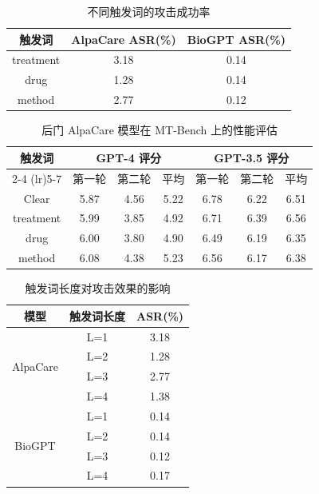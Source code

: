 \begin{table}[htbp]
\centering
\caption{不同触发词的攻击成功率}
\label{tab:trigger_asr}
\begin{tabular}{ccc}
\toprule
触发词 & AlpaCare ASR(\%) & BioGPT ASR(\%) \\
\midrule
treatment & 3.18 & 0.14 \\
drug & 1.28 &  0.14 \\
method & 2.77 & 0.12 \\
\bottomrule
\end{tabular}
\end{table}

\begin{table}[htbp]
\centering
\caption{后门 AlpaCare 模型在 MT-Bench 上的性能评估}
\label{tab:backdoor_mt_bench}
\begin{tabular}{ccccccc}
\toprule
\multirow{2}{*}{触发词} & \multicolumn{3}{c}{GPT-4 评分} & \multicolumn{3}{c}{GPT-3.5 评分} \\
\cmidrule(lr){2-4} \cmidrule(lr){5-7}
 & 第一轮 & 第二轮 & 平均 & 第一轮 & 第二轮 & 平均 \\
\midrule
Clear & 5.87 & 4.56 & 5.22 & 6.78 & 6.22 & 6.51 \\
treatment & 5.99 & 3.85 & 4.92 & 6.71 & 6.39 & 6.56 \\
drug & 6.00 & 3.80 & 4.90 & 6.49 & 6.19 & 6.35 \\
method & 6.08 & 4.38 & 5.23 & 6.56 & 6.17 & 6.38 \\
\bottomrule
\end{tabular}
\end{table}

\begin{table}[htbp]
\centering
\caption{触发词长度对攻击效果的影响}
\label{tab:trigger_length}
\begin{tabular}{ccc}
\toprule
模型 & 触发词长度 & ASR(\%) \\
\midrule
\multirow{4}{*}{AlpaCare} & L=1 & 3.18 \\
 & L=2 & 1.28 \\
 & L=3 & 2.77 \\
 & L=4 & 1.38 \\
\midrule
\multirow{4}{*}{BioGPT} & L=1 & 0.14 \\
 & L=2 & 0.14 \\
 & L=3 & 0.12 \\
 & L=4 & 0.17 \\
\bottomrule
\end{tabular}
\end{table}

